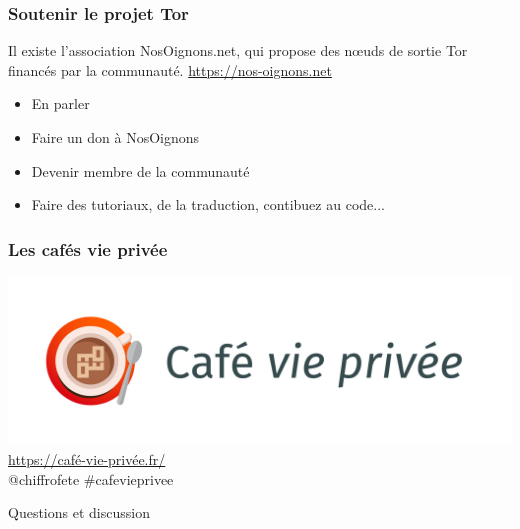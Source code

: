\documentclass{beamer}
\begin{document}
\begin{frame}
\frametitle{Soutenir le projet Tor}
Il existe l'association NosOignons.net, qui propose des nœuds de sortie Tor financés par la communauté.
\url{https://nos-oignons.net}
\begin{itemize}
\item En parler
\item Faire un don à NosOignons
\item Devenir membre de la communauté
\item Faire des tutoriaux, de la traduction, contibuez au code...
\end{itemize}
\end{frame}
\begin{frame}
\frametitle{Les cafés vie privée}
\begin{center}
\includegraphics[scale=0.4]{./images/LogoCafeViePrivee.jpg}
\\ \url{https://café-vie-privée.fr/}
\\ @chiffrofete \#cafevieprivee
\end{center}
\end{frame}
\begin{frame}
\begin{center}
\Huge{Questions et discussion}
\end{center}
\end{frame}
\end{document}
